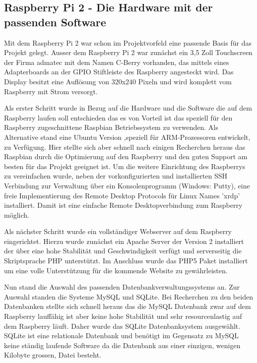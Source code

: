 \documentclass[11pt,a4paper]{article} %
\begin{document}
\subsection{Raspberry Pi 2 - Die Hardware mit der passenden Software}
Mit dem Raspberry Pi 2 war schon im Projektvorfeld eine passende Basis f\"ur das Projekt gelegt. Ausser dem Raspberry Pi 2 war zun\"achst ein 3,5 Zoll Touchscreen der Firma admatec mit dem Namen C-Berry vorhanden, das mittels eines Adapterboards an der GPIO Stiftleiste des Raspberry angesteckt wird. Das Display besitzt eine Aufl\"osung von 320x240 Pixeln und wird komplett vom Raspberry mit Strom versorgt.
\par
Als erster Schritt wurde in Bezug auf die Hardware und die Software die auf dem Raspberry laufen soll entschieden das es von Vorteil ist das speziell f\"ur den Raspberry zugeschnittene Raspbian Betriebssystem zu verwenden. Als Alternative stand eine Ubuntu Version ,speziell f\"ur ARM-Prozessoren entwickelt, zu Verf\"ugung. Hier stellte sich aber schnell nach einigen Recherchen heraus das Raspbian durch die Optimierung auf den Raspberry und den guten Support am besten f\"ur das Projekt geeignet ist. Um die weitere Einrichtung des Raspberrys zu vereinfachen wurde, neben der vorkonfigurierten und installierten SSH Verbindung zur Verwaltung \"uber ein Konsolenprogramm (Windows: Putty), eine freie Implementierung des Remote Desktop Protocols f\"ur Linux Names 'xrdp' installiert. Damit ist eine einfache Remote Desktopverbindung zum Raspberry m\"oglich.
\par
Als n\"achster Schritt wurde ein vollst\"andiger Webserver auf dem Raspberry eingerichtet. Hierzu wurde zun\"achst ein Apache Server der Version 2 installiert der \"uber eine hohe Stabilit\"at und Geschwindigkeit verf\"ugt und serverseitig die Skriptsprache PHP unterst\"utzt. Im Anschluss wurde das PHP5 Paket installiert um eine volle Unterst\"utzung f\"ur die kommende Website zu gew\"ahrleisten.
\par
Nun stand die Auswahl des passenden Datenbankverwaltungssystems an. Zur Auswahl standen die Systeme MySQL und SQLite. Bei Recherchen zu den beiden Datenbanken stellte sich schnell heraus das die MySQL Datenbank zwar auf dem Raspberry lauff\"ahig ist aber keine hohe Stabilit\"at und sehr resourcenlastig auf dem Raspberry l\"auft. Daher wurde das SQLite Datenbanksystem ausgew\"ahlt. SQLite ist eine relationale Datenbank und ben\"otigt im Gegensatz zu MySQL keine st\"andig laufende Software da die Datenbank aus einer einzigen, wenigen Kilobyte grossen, Datei besteht.
\end{document}
